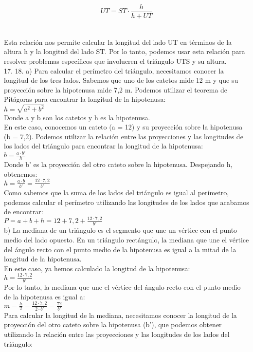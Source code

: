 \documentclass{article}
\begin{document}
\\
$$UT = ST \cdot \frac{h}{h + UT}$$\\
\\
Esta relación nos permite calcular la longitud del lado UT en términos de la altura h y la longitud del lado ST. Por lo tanto, podemos usar esta relación para resolver problemas específicos que involucren el triángulo UTS y su altura.\\
{\Large 17.}
{\Large 18.}
a) Para calcular el perímetro del triángulo, necesitamos conocer la longitud de los tres lados. Sabemos que uno de los catetos mide 12 m y que su proyección sobre la hipotenusa mide 7,2 m. Podemos utilizar el teorema de Pitágoras para encontrar la longitud de la hipotenusa:\\
$h = \sqrt{a^2 + b^2}$\\
Donde a y b son los catetos y h es la hipotenusa.\\
En este caso, conocemos un cateto (a = 12) y su proyección sobre la hipotenusa (b = 7,2). Podemos utilizar la relación entre las proyecciones y las longitudes de los lados del triángulo para encontrar la longitud de la hipotenusa:\\
$b = \frac{a \cdot b'}{h}$\\
Donde b' es la proyección del otro cateto sobre la hipotenusa. Despejando h, obtenemos:\\
$h = \frac{a \cdot b}{b'} = \frac{12 \cdot 7,2}{b'}$\\
Como sabemos que la suma de los lados del triángulo es igual al perímetro, podemos calcular el perímetro utilizando las longitudes de los lados que acabamos de encontrar:\\
$P = a + b + h = 12 + 7,2 + \frac{12 \cdot 7,2}{b'}$\\
b) La mediana de un triángulo es el segmento que une un vértice con el punto medio del lado opuesto. En un triángulo rectángulo, la mediana que une el vértice del ángulo recto con el punto medio de la hipotenusa es igual a la mitad de la longitud de la hipotenusa.\\
En este caso, ya hemos calculado la longitud de la hipotenusa:\\
$h = \frac{12 \cdot 7,2}{b'}$\\
Por lo tanto, la mediana que une el vértice del ángulo recto con el punto medio de la hipotenusa es igual a:\\
$m = \frac{h}{2} = \frac{12 \cdot 7,2}{2 \cdot b'} = \frac{72}{b'}$\\
Para calcular la longitud de la mediana, necesitamos conocer la longitud de la proyección del otro cateto sobre la hipotenusa (b'), que podemos obtener utilizando la relación entre las proyecciones y las longitudes de los lados del triángulo:\\
\end{document}
